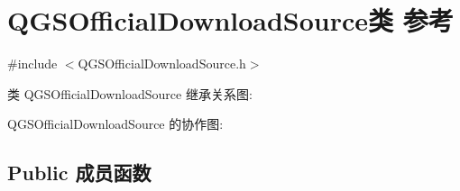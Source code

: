 \hypertarget{class_q_g_s_official_download_source}{}\section{Q\+G\+S\+Official\+Download\+Source类 参考}
\label{class_q_g_s_official_download_source}


{\ttfamily \#include $<$Q\+G\+S\+Official\+Download\+Source.\+h$>$}



类 Q\+G\+S\+Official\+Download\+Source 继承关系图\+:


Q\+G\+S\+Official\+Download\+Source 的协作图\+:
\subsection*{Public 成员函数}
